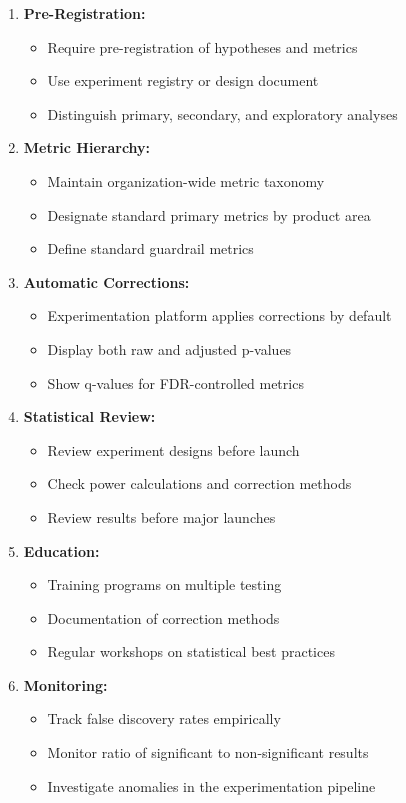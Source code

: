 \begin{enumerate}
    \item \textbf{Pre-Registration:}
    \begin{itemize}
        \item Require pre-registration of hypotheses and metrics
        \item Use experiment registry or design document
        \item Distinguish primary, secondary, and exploratory analyses
    \end{itemize}

    \item \textbf{Metric Hierarchy:}
    \begin{itemize}
        \item Maintain organization-wide metric taxonomy
        \item Designate standard primary metrics by product area
        \item Define standard guardrail metrics
    \end{itemize}

    \item \textbf{Automatic Corrections:}
    \begin{itemize}
        \item Experimentation platform applies corrections by default
        \item Display both raw and adjusted p-values
        \item Show q-values for FDR-controlled metrics
    \end{itemize}

    \item \textbf{Statistical Review:}
    \begin{itemize}
        \item Review experiment designs before launch
        \item Check power calculations and correction methods
        \item Review results before major launches
    \end{itemize}

    \item \textbf{Education:}
    \begin{itemize}
        \item Training programs on multiple testing
        \item Documentation of correction methods
        \item Regular workshops on statistical best practices
    \end{itemize}

    \item \textbf{Monitoring:}
    \begin{itemize}
        \item Track false discovery rates empirically
        \item Monitor ratio of significant to non-significant results
        \item Investigate anomalies in the experimentation pipeline
    \end{itemize}
\end{enumerate}

